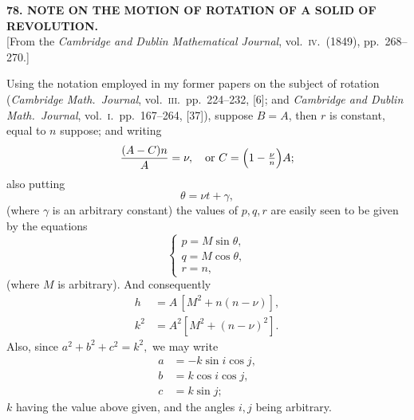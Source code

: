 \documentclass[11pt]{article}
\begin{document}
\bigskip
\begin{center}
\textbf{78. NOTE ON THE MOTION OF ROTATION OF A SOLID OF REVOLUTION.}\\[2pt]
[From the \textit{Cambridge and Dublin Mathematical Journal}, vol.~\textsc{iv}.\ (1849), pp.~268--270.]
\end{center}

Using the notation employed in my former papers on the subject of rotation (\textit{Cambridge Math.\ Journal}, vol.~\textsc{iii}.\ pp.~224--232, [6]; and \textit{Cambridge and Dublin Math.\ Journal}, vol.~\textsc{i}.\ pp.~167--264, [37]), suppose $B = A$, then $r$ is constant, equal to $n$ suppose; and writing
\[ \frac{(A - C)n}{A} = \nu,\quad \text{or } C = \Bigl(1 - \tfrac{\nu}{n}\Bigr)A; \]
also putting
\[ \theta = \nu t + \gamma, \]
(where $\gamma$ is an arbitrary constant) the values of $p, q, r$ are easily seen to be given by the equations
\[ \begin{cases} p = M\sin\theta,\\ q = M\cos\theta,\\ r = n, \end{cases} \]
(where $M$ is arbitrary). And consequently
\[
\begin{aligned}
h &= A\,[M^2 + n(n - \nu)],\\
k^2 &= A^2[M^2 + (n - \nu)^2].
\end{aligned}
\]
Also, since $a^2 + b^2 + c^2 = k^2,$ we may write
\[
\begin{aligned}
a &= -k\sin i \cos j,\\
b &= k\cos i \cos j,\\
c &= k\sin j;
\end{aligned}
\]
$k$ having the value above given, and the angles $i, j$ being arbitrary.
\end{document}
